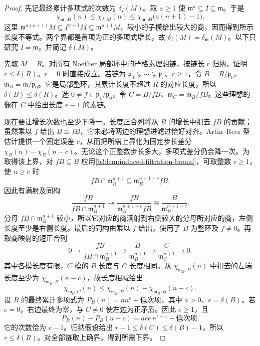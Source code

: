 \begin{proof}
	先记最终累计多项式的次数为 \(\delta_I(M)\)。取 \(a\ge1\) 使 \(\mathfrak m^a\subseteq I\subseteq\mathfrak m\)。于是
	\[
		\chi_{\mathfrak m,M}(n)\le\chi_{I,M}(n) \le\chi_{\mathfrak m,M}\bigl(a(n+1)-1\bigr).
	\]
	这里 \(\mathfrak m^{a(n+1)}M\subseteq I^{n+1}M\subseteq\mathfrak m^{n+1}M\)，较小的子模给出较大的商，因而得到所示长度不等式。两个界都是首项为正的多项式增长，故 \(\delta_I(M)=\delta_{\mathfrak m}(M)\)。以下只研究 \(I=\mathfrak m\)，并简记 \(\delta(M)\)。

	先取 \(M=R\)。对所有 Noether 局部环中的严格素理想链，按链长 \(r\) 归纳，证明 \(r\le\delta(R)\)。\(r=0\) 时直接成立。若链为 \(\mathfrak p_0\subsetneq\cdots\subsetneq\mathfrak p_r\)、\(r\ge1\)，令 \(B=R/\mathfrak p_0\)、\(\mathfrak m_B=\mathfrak m/\mathfrak p_0\)。它是局部整环，其累计长度不超过 \(R\) 的对应长度，所以 \(\delta(B)\le\delta(R)\)。选 \(0\ne f\in\mathfrak p_1/\mathfrak p_0\)，令 \(C=B/fB\)、\(\mathfrak m_C=\mathfrak m_B/fB\)。这些理想的像在 \(C\) 中给出长度 \(r-1\) 的素链。

	现在要让增长次数也至少下降一。长度正合列将从 \(B\) 的增长中扣去 \(fB\) 的贡献；虽然乘以 \(f\) 给出 \(B\cong fB\)，它未必将两边的理想进滤过恰好对齐。Artin--Rees 型估计提供一个固定误差 \(c\)，从而把所需上界化为固定步长差分 \(\chi_B(n)-\chi_B(n-c)\)。无论这个正整数步长多大，多项式差分仍会降一次。为取得该上界，对 \(fB\subseteq B\) 应用\cref{b3:lem:induced-filtration-bound}，可取整数 \(c\ge1\)，使 \(n\ge c\) 时
	\[
		fB\cap\mathfrak m_B^{n+1}\subseteq\mathfrak m_B^{n+1-c}fB.
	\]
	因此有满射及同构
	\[
		\dfrac{fB}{fB\cap\mathfrak m_B^{n+1}} \twoheadrightarrow\dfrac{fB}{\mathfrak m_B^{n+1-c}fB} \cong\dfrac{B}{\mathfrak m_B^{n+1-c}}.
	\]
	分母 \(fB\cap\mathfrak m_B^{n+1}\) 较小，所以它对应的商满射到右侧较大的分母所对应的商，左侧长度至少是右侧长度。最后的同构由乘以 \(f\) 给出，使用了 \(B\) 为整环及 \(f\ne0\)。再取商映射的短正合列
	\[
		0\longrightarrow\dfrac{fB}{fB\cap\mathfrak m_B^{n+1}} \longrightarrow\dfrac{B}{\mathfrak m_B^{n+1}} \longrightarrow\dfrac{C}{\mathfrak m_C^{n+1}} \longrightarrow0.
	\]
	其中各模长度有限，\(C\) 模的 \(B\) 长度与 \(C\) 长度相同。从 \(\chi_{\mathfrak m_B,B}(n)\) 中扣去的左端长度至少为 \(\chi_{\mathfrak m_B,B}(n-c)\)，故长度相减给出
	\[
		\chi_{\mathfrak m_C,C}(n) \le\chi_{\mathfrak m_B,B}(n)-\chi_{\mathfrak m_B,B}(n-c).
	\]
	设 \(B\) 的最终累计多项式为 \(P_B(n)=a n^e+\text{低次项}\)，其中 \(a>0\)、\(e=\delta(B)\)。若 \(e=0\)，右边最终为零，与 \(C\ne0\) 使左边为正矛盾。因此 \(e\ge1\)，且
	\[
		P_B(n)-P_B(n-c)=ace\,n^{e-1}+\text{低次项}.
	\]
	它的次数恰为 \(e-1\)。归纳假设给出 \(r-1\le\delta(C)\le\delta(B)-1\)，所以 \(r\le\delta(R)\)。对全部链取上确界，得到所需下界。


\end{proof}
